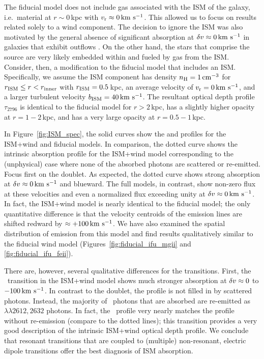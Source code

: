\documentclass[]{emulateapj}
\begin{document}
The fiducial model does not include gas associated with
the ISM %
of the galaxy, i.e.\ material at $r \sim
0$\,kpc with $v_{\rm r} \approx 0 \, {\rm km~s^{-1}}$.  This allowed us to focus on
results related solely to a wind component.  The decision to ignore the ISM
was also motivated by the general absence of significant absorption at
$\delta v \approx 0 \, {\rm km~s^{-1}}$ in galaxies that exhibit outflows 
\citep[e.g.][]{wcp+09,rwk+10,steidel+10}.
On the other hand, the stars that comprise the
source are very likely embedded within and fueled by gas
from the ISM.  
Consider, then, a modification to the fiducial model that 
includes an ISM. 
Specifically, we assume the ISM component has density $n_{\rm H} = 1 \, {\rm cm^{-3}}$ for
$r_{\rm ISM} \le r < r_{\rm inner}$ with $r_{\rm ISM} = 0.5$\,kpc, 
an average velocity of $v_{\rm r} = 0 \, {\rm km~s^{-1}}$, and a larger turbulent velocity $b_{\rm ISM} = 40 \, {\rm km~s^{-1}}$.
The resultant optical depth profile $\tau_{2796}$ is identical to the
fiducial model for $r > 2$\,kpc, has a slightly higher opacity at
$r=1-2$\,kpc, and has a very large opacity at $r = 0.5-1$\,kpc.

In Figure~\ref{fig:ISM_spec}, the solid curves show the  and
 profiles for the ISM+wind and fiducial 
models. In comparison, the
dotted curve shows the intrinsic absorption profile for the ISM+wind
model corresponding to the (unphysical) case
where none of the absorbed photons are scattered or re-emitted.   Focus first on the
 doublet.  As expected, the dotted curve shows strong
absorption at $\delta v \approx 0 \, {\rm km~s^{-1}}$ and blueward.  The full models,
in contrast, show non-zero flux at these velocities and even a
normalized flux exceeding unity at $\delta v \approx 0 \, {\rm km~s^{-1}}$.  In
fact, the ISM+wind model is nearly identical to the fiducial model;
the only quantitative difference is that the velocity centroids of
the emission lines are shifted redward by $\approx +100 \, {\rm km~s^{-1}}$.
We have also examined the spatial distribution of emission from 
this model and find results
qualitatively similar to the fiducial wind model
(Figures~\ref{fig:fiducial_ifu_mgii} and \ref{fig:fiducial_ifu_feii}).

There are, however, several qualitative differences 
for the  transitions. 
First, the \feiia\ transition in the ISM+wind model
shows much stronger absorption at $\delta v \approx 0$
to $-100 \, {\rm km~s^{-1}}$.  In contrast to the  doublet,
the profile is not filled in by scattered photons. Instead, 
the majority of \feiia\ photons that are absorbed are re-emitted as
\feiis$\lambda\lambda 2612, 2632$ photons.  In fact, the
\feiia\ profile very nearly matches the profile without re-emission 
(compare to the dotted lines); this transition provides a
very good description of the intrinsic ISM+wind optical depth profile.  
We conclude that resonant transitions that are coupled to (multiple)
non-resonant, electric dipole transitions offer the best
diagnosis of ISM absorption.
\end{document}
